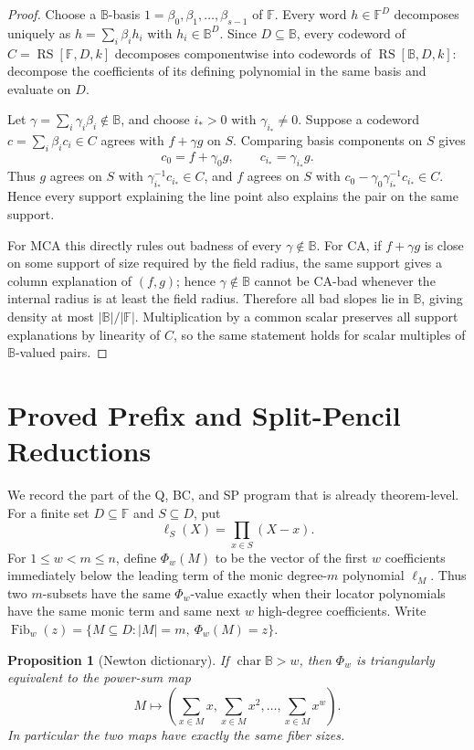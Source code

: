 \documentclass[a4paper,11pt]{amsart}
\newtheorem{proposition}[proposition]{Proposition}
\theoremstyle{remark}
\newcommand{\F}{\mathbb F}
\newcommand{\B}{\mathbb B}
\newcommand{\RS}{\operatorname{RS}}
\newcommand{\Fib}{\operatorname{Fib}}
\begin{document}
\begin{proof}
Choose a \(\B\)-basis \(1=\beta_0,\beta_1,\ldots,\beta_{s-1}\) of \(\F\).  Every word \(h\in\F^D\) decomposes uniquely as \(h=\sum_i\beta_i h_i\) with \(h_i\in\B^D\).  Since \(D\subseteq\B\), every codeword of \(C=\RS[\F,D,k]\) decomposes componentwise into codewords of \(\RS[\B,D,k]\): decompose the coefficients of its defining polynomial in the same basis and evaluate on \(D\).

Let \(\gamma=\sum_i\gamma_i\beta_i\notin\B\), and choose \(i_*>0\) with \(\gamma_{i_*}\ne0\).  Suppose a codeword \(c=\sum_i\beta_i c_i\in C\) agrees with \(f+\gamma g\) on \(S\).  Comparing basis components on \(S\) gives
\[
        c_0=f+\gamma_0 g,\qquad
        c_{i_*}=\gamma_{i_*}g .
\]
Thus \(g\) agrees on \(S\) with \(\gamma_{i_*}^{-1}c_{i_*}\in C\), and \(f\) agrees on \(S\) with \(c_0-\gamma_0\gamma_{i_*}^{-1}c_{i_*}\in C\).  Hence every support explaining the line point also explains the pair on the same support.

For MCA this directly rules out badness of every \(\gamma\notin\B\).  For CA, if \(f+\gamma g\) is close on some support of size required by the field radius, the same support gives a column explanation of \((f,g)\); hence \(\gamma\notin\B\) cannot be CA-bad whenever the internal radius is at least the field radius.  Therefore all bad slopes lie in \(\B\), giving density at most \(|\B|/|\F|\).  Multiplication by a common scalar preserves all support explanations by linearity of \(C\), so the same statement holds for scalar multiples of \(\B\)-valued pairs.
\end{proof}

\section{Proved Prefix and Split-Pencil Reductions}

We record the part of the Q, BC, and SP program that is already theorem-level.  For a finite set \(D\subseteq\F\) and \(S\subseteq D\), put
\[
        \ell_S(X)=\prod_{x\in S}(X-x).
\]
For \(1\le w<m\le n\), define \(\Phi_w(M)\) to be the vector of the first \(w\) coefficients immediately below the leading term of the monic degree-\(m\) polynomial \(\ell_M\).  Thus two \(m\)-subsets have the same \(\Phi_w\)-value exactly when their locator polynomials have the same monic term and same next \(w\) high-degree coefficients.  Write \(\Fib_w(z)=\{M\subseteq D: |M|=m,\ \Phi_w(M)=z\}\).

\begin{proposition}[Newton dictionary]\label{prop:newton}
If \(\operatorname{char}\B>w\), then \(\Phi_w\) is triangularly equivalent to the power-sum map
\[
        M\longmapsto \left(\sum_{x\in M}x,\sum_{x\in M}x^2,\ldots,\sum_{x\in M}x^w\right).
\]
In particular the two maps have exactly the same fiber sizes.
\end{proposition}
\end{document}
